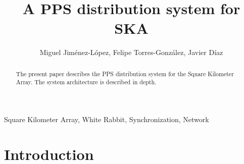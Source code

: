 \documentclass[review]{elsarticle}
\begin{document}
\begin{frontmatter}

\title{A PPS distribution system for SKA}


\author{Miguel Jiménez-López, Felipe Torres-González, Javier Díaz}
\address{CITIC, ETSIIT, University of Granada}





\begin{abstract} 
	The present paper describes the PPS distribution system for the Square Kilometer Array. The system architecture is described in depth. 
\end{abstract}

\begin{keyword}
	Square Kilometer Array, White Rabbit, Synchronization, Network
\end{keyword}

\end{frontmatter}

\linenumbers

\section{Introduction}

\end{document}
